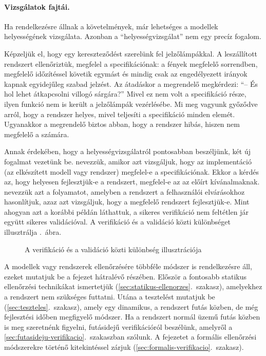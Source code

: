 \paragraph{Vizsgálatok fajtái.}
Ha rendelkezésre állnak a követelmények, már lehetséges a modellek helyességének vizsgálata. Azonban a ``helyességvizsgálat'' nem egy precíz fogalom. 

\begin{megjegyzes}
Képzeljük el, hogy egy kereszteződést szerelünk fel jelzőlámpákkal. A leszállított rendszert ellenőriztük, megfelel a specifikációnak: a fények megfelelő sorrendben, megfelelő időzítéssel követik egymást és mindig csak az engedélyezett irányok kapnak egyidejűleg szabad jelzést. Az átadáskor a megrendelő megkérdezi: ``-- És hol lehet átkapcsolni villogó sárgára?'' Mivel ez nem volt a specifikáció része, ilyen funkció nem is került a jelzőlámpák vezérlésébe. Mi meg vagyunk győződve arról, hogy a rendszer helyes, mivel teljesíti a specifikáció minden elemét. Ugyanakkor a megrendelő biztos abban, hogy a rendszer hibás, hiszen nem megfelelő a számára.
\end{megjegyzes}

Annak érdekében, hogy a helyességvizsgálatról pontosabban beszéljünk, két új fogalmat vezetünk be.  nevezzük, amikor azt vizsgáljuk, hogy az implementáció (az elkészített modell vagy rendszer) megfelel-e a specifikációnak. Ekkor a kérdés az, hogy helyesen fejlesztjük-e a rendszert, megfelel-e az az előírt kívánalmaknak.  nevezzük azt a folyamatot, amelyben a rendszert a felhasználói elvárásokhoz hasonlítjuk, azaz azt vizsgáljuk, hogy a megfelelő rendszert fejlesztjük-e. Mint ahogyan azt a korábbi példán láthattuk, a sikeres verifikáció nem feltétlen jár együtt sikeres validációval. A verifikáció és a validáció közti különbséget illusztrálja .~ábra.

\begin{figure}[h]
	\centering
	
	
	\caption{A verifikáció és a validáció közti különbség illusztrációja}
	\label{fig:verifikacio_vs_validacio}
\end{figure}

A modellek vagy rendszerek ellenőrzésére többféle módszer is rendelkezésre áll, ezeket mutatjuk be a fejezet hátralévő részében. Először a fontosabb statikus ellenőrzési technikákat ismertetjük (\ref{sec:statikus-ellenorzes}.~szakasz), amelyekhez a rendszert nem szükséges futtatni. Utána a tesztelést mutatjuk be (\ref{sec:teszteles}.~szakasz), amely egy dinamikus, a rendszert futás közben, de még fejlesztési időben megfigyelő módszer. Ha a rendszert normál üzemű futás közben is meg szeretnénk figyelni, futásidejű verifikációról beszélünk, amelyről a \ref{sec:futasideju-verifikacio}.~szakaszban szólunk. A fejezetet a formális ellenőrzési módszerekre történő kitekintéssel zárjuk (\ref{sec:formalis-verifikacio}.~szakasz).



